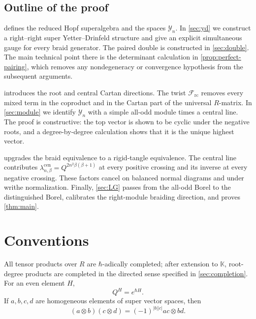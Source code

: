 \documentclass[11pt,a4paper]{article}
\newcommand{\hK}{\mathbb K}
\newcommand{\ot}{\otimes}
\newcommand{\rc}{\mathrm{rc}}
\newcommand{\cen}{\mathrm{cen}}
\theoremstyle{definition}
\theoremstyle{remark}
\begin{document}
\subsection{Outline of the proof}

 defines the reduced Hopf superalgebra and the spaces
\(\mathcal Y_n\).  In \cref{sec:yd} we construct a right--right
super Yetter--Drinfeld structure and give an explicit simultaneous gauge
for every braid generator.  The paired double is constructed in
\cref{sec:double}.  The main technical point there is the determinant
calculation in \cref{prop:perfect-pairing}, which removes any
nondegeneracy or convergence hypothesis from the subsequent arguments.

 introduces the root and central Cartan directions.
The twist \(\mathcal F_{\rc}\) removes every mixed term in the coproduct
and in the Cartan part of the universal \(R\)-matrix.  In
\cref{sec:module} we identify \(\mathcal Y_n\) with a simple all-odd
module times a central line.  The proof is constructive: the top vector
is shown to be cyclic under the negative roots, and a degree-by-degree
calculation shows that it is the unique highest vector.

 upgrades the braid equivalence to a rigid-tangle
equivalence.  The central line contributes
\(\lambda_{n,\beta}^{\cen}=Q^{2n^2\beta(\beta+1)}\) at every positive
crossing and its inverse at every negative crossing.  These factors cancel
on balanced normal diagrams and under writhe normalization.  Finally,
\cref{sec:LG} passes from the all-odd Borel to the distinguished Borel,
calibrates the right-module braiding direction, and proves
\cref{thm:main}.

\section{Conventions}\label{sec:conventions}

All tensor products over \(R\) are \(\hbar\)-adically completed; after
extension to \(\hK\), root-degree products are completed in the directed
sense specified in \cref{sec:completion}.  For an even element \(H\),
\[
 Q^H=e^{\hbar H}.
\]
If \(a,b,c,d\) are homogeneous elements of super vector spaces, then
\begin{equation}\label{eq:koszul}
 (a\ot b)(c\ot d)=(-1)^{|b||c|}ac\ot bd.
\end{equation}
\end{document}
